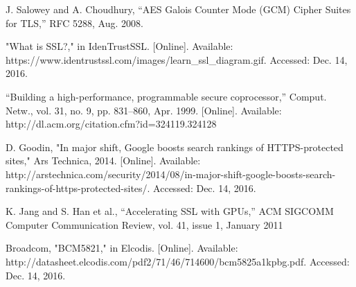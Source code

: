 \documentclass[journal]{IEEEtran}
\begin{document}
\begin{thebibliography}{1}
J. Salowey and A. Choudhury, “AES Galois Counter Mode (GCM) Cipher Suites for TLS,” RFC 5288, Aug. 2008.

"What is SSL?," in IdenTrustSSL. [Online]. Available: https://www.identrustssl.com/images/learn\_ssl\_diagram.gif. Accessed: Dec. 14, 2016.

“Building a high-performance, programmable secure coprocessor,” Comput.
Netw., vol. 31, no. 9, pp. 831–860, Apr. 1999. [Online]. Available:
http://dl.acm.org/citation.cfm?id=324119.324128

D. Goodin, "In major shift, Google boosts search rankings of HTTPS-protected sites," Ars Technica, 2014. [Online]. Available: http://arstechnica.com/security/2014/08/in-major-shift-google-boosts-search-rankings-of-https-protected-sites/. Accessed: Dec. 14, 2016.

K. Jang and S. Han et al., “Accelerating SSL with GPUs,” ACM
SIGCOMM Computer Communication Review, vol. 41, issue 1,
January 2011

Broadcom, "BCM5821," in Elcodis. [Online]. Available: http://datasheet.elcodis.com/pdf2/71/46/714600/bcm5825a1kpbg.pdf. Accessed: Dec. 14, 2016.

\end{thebibliography}


\end{document}
